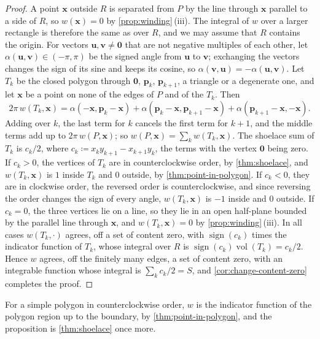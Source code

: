 \begin{proof}
A point $\mathbf x$ outside $R$ is separated from $P$ by the line through $\mathbf x$ parallel to a side of $R$, so $w(\mathbf x)=0$ by \cref{prop:winding}\,(iii). The integral of $w$ over a larger rectangle is therefore the same as over $R$, and we may assume that $R$ contains the origin. For vectors $\mathbf u,\mathbf v\ne\mathbf0$ that are not negative multiples of each other, let $\alpha(\mathbf u,\mathbf v)\in(-\pi,\pi)$ be the signed angle from $\mathbf u$ to $\mathbf v$; exchanging the vectors changes the sign of its sine and keeps its cosine, so $\alpha(\mathbf v,\mathbf u)=-\alpha(\mathbf u,\mathbf v)$. Let $T_k$ be the closed polygon through $\mathbf0$, $\mathbf p_k$, $\mathbf p_{k+1}$, a triangle or a degenerate one, and let $\mathbf x$ be a point on none of the edges of $P$ and of the $T_k$. Then
\[
2\pi\,w(T_k,\mathbf x)=\alpha(-\mathbf x,\mathbf p_k-\mathbf x)+\alpha(\mathbf p_k-\mathbf x,\mathbf p_{k+1}-\mathbf x)+\alpha(\mathbf p_{k+1}-\mathbf x,-\mathbf x).
\]
Adding over $k$, the last term for $k$ cancels the first term for $k+1$, and the middle terms add up to $2\pi\,w(P,\mathbf x)$; so $w(P,\mathbf x)=\sum_kw(T_k,\mathbf x)$. The shoelace sum of $T_k$ is $c_k/2$, where $c_k\coloneqq x_ky_{k+1}-x_{k+1}y_k$, the terms with the vertex $\mathbf0$ being zero. If $c_k>0$, the vertices of $T_k$ are in counterclockwise order, by \cref{thm:shoelace}, and $w(T_k,\mathbf x)$ is $1$ inside $T_k$ and $0$ outside, by \cref{thm:point-in-polygon}. If $c_k<0$, they are in clockwise order, the reversed order is counterclockwise, and since reversing the order changes the sign of every angle, $w(T_k,\mathbf x)$ is $-1$ inside and $0$ outside. If $c_k=0$, the three vertices lie on a line, so they lie in an open half-plane bounded by the parallel line through $\mathbf x$, and $w(T_k,\mathbf x)=0$ by \cref{prop:winding}\,(iii). In all cases $w(T_k,\cdot)$ agrees, off a set of content zero, with $\operatorname{sign}(c_k)$ times the indicator function of $T_k$, whose integral over $R$ is $\operatorname{sign}(c_k)\operatorname{vol}(T_k)=c_k/2$. Hence $w$ agrees, off the finitely many edges, a set of content zero, with an integrable function whose integral is $\sum_kc_k/2=S$, and \cref{cor:change-content-zero} completes the proof.
\end{proof}

For a simple polygon in counterclockwise order, $w$ is the indicator function of the polygon region up to the boundary, by \cref{thm:point-in-polygon}, and the proposition is \cref{thm:shoelace} once more.

